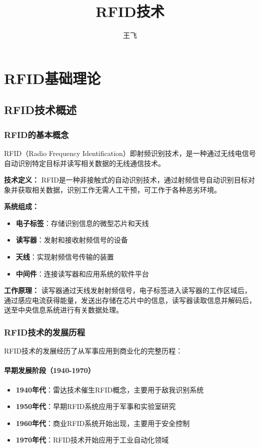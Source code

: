 \documentclass[12pt,UTF8]{ctexbook}
\title{\heiti\zihao{0} RFID技术}
\author{王飞}
\date{}
\begin{document}
\maketitle
\tableofcontents

\frontmatter

\mainmatter

\part{RFID基础理论}

\chapter{RFID技术概述}

\section{RFID的基本概念}

RFID（Radio Frequency Identification）即射频识别技术，是一种通过无线电信号自动识别特定目标并读写相关数据的无线通信技术。

\textbf{技术定义：}
RFID是一种非接触式的自动识别技术，通过射频信号自动识别目标对象并获取相关数据，识别工作无需人工干预，可工作于各种恶劣环境。

\textbf{系统组成：}
\begin{itemize}[leftmargin=3.5em]
    \item \textbf{电子标签}：存储识别信息的微型芯片和天线
    \item \textbf{读写器}：发射和接收射频信号的设备
    \item \textbf{天线}：实现射频信号传输的装置
    \item \textbf{中间件}：连接读写器和应用系统的软件平台
\end{itemize}

\textbf{工作原理：}
读写器通过天线发射射频信号，电子标签进入读写器的工作区域后，通过感应电流获得能量，发送出存储在芯片中的信息，读写器读取信息并解码后，送至中央信息系统进行有关数据处理。

\section{RFID技术的发展历程}

RFID技术的发展经历了从军事应用到商业化的完整历程：

\subsection{早期发展阶段（1940-1970）}
\begin{itemize}[leftmargin=3.5em]
    \item \textbf{1940年代}：雷达技术催生RFID概念，主要用于敌我识别系统
    \item \textbf{1950年代}：早期RFID系统应用于军事和实验室研究
    \item \textbf{1960年代}：商业RFID系统开始出现，主要用于安全控制
    \item \textbf{1970年代}：RFID技术开始应用于工业自动化领域
\end{itemize}
\end{document}
